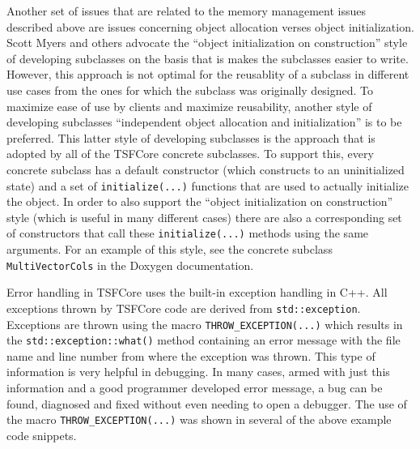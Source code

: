 \documentclass[10pt,fleqn]{article}
\begin{document}
Another set of issues that are related to the memory management issues
described above are issues concerning object allocation verses object
initialization.  Scott Myers \cite{ref:meyers_1996} and others
advocate the ``object initialization on construction'' style of
developing subclasses on the basis that is makes the subclasses easier
to write.  However, this approach is not optimal for the reusablity of
a subclass in different use cases from the ones for which the subclass
was originally designed.  To maximize ease of use by clients and
maximize reusability, another style of developing subclasses
``independent object allocation and initialization'' is to be
preferred.  This latter style of developing subclasses is the approach
that is adopted by all of the TSFCore concrete subclasses.  To support
this, every concrete subclass has a default constructor (which
constructs to an uninitialized state) and a set of
\texttt{initialize(...)}  functions that are used to actually
initialize the object.  In order to also support the ``object
initialization on construction'' style (which is useful in many
different cases) there are also a corresponding set of constructors
that call these \texttt{initialize(...)} methods using the same
arguments.  For an example of this style, see the concrete subclass
\texttt{MultiVectorCols} in the Doxygen documentation.

Error handling in TSFCore uses the built-in exception handling in C++.
All exceptions thrown by TSFCore code are derived from
\texttt{std::exception}.  Exceptions are thrown using the macro
\texttt{THROW\_EXCEPTION(...)} which results in the \texttt{std::exception::what()}
method containing an error message with the file name and line number
from where the exception was thrown.  This type of information is very
helpful in debugging.  In many cases, armed with just this information
and a good programmer developed error message, a bug can be found,
diagnosed and fixed without even needing to open a debugger.  The use
of the macro \texttt{THROW\_EXCEPTION(...)} was shown in several of
the above example code snippets.
\end{document}
